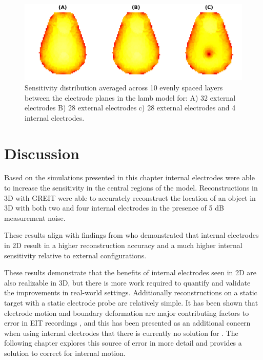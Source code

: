\begin{figure}[H]
\centering
\includegraphics[width=\columnwidth]{chapter6-internal_electrodes/imgs/lamb_sensitivity_profiles.pdf}
\caption[Sensitivity distribution in a lamb model]{\label{fig:sens_example}%
Sensitivity distribution averaged across 10 evenly spaced layers
between the electrode planes in the lamb model for: 
A) 32 external electrodes 
B) 28 external electrodes 
c) 28 external electrodes and 4 internal electrodes.
}
\end{figure}

\section{Discussion}

Based on the simulations presented in this chapter 
internal electrodes were able to increase the sensitivity in 
the central regions of the model. 
Reconstructions in 3D with GREIT were able to accurately 
reconstruct the location of an object in 3D with both 
two and four internal electrodes in the presence of 5 dB 
measurement noise. 

These results align with findings 
from 
who demonstrated that internal electrodes in 2D 
result in a higher reconstruction accuracy and 
a much higher internal sensitivity relative to external configurations.

These results demonstrate that the benefits of internal electrodes seen in 2D
are also realizable in 3D, but there is more 
work required to quantify and validate the improvements in real-world settings. 
Additionally reconstructions on a static target with a static electrode probe
are relatively simple. It has been shown that electrode motion and boundary
deformation are major contributing factors to error in EIT 
recordings \parencite{boyle_impact_2011,grychtol_impact_2012}, and this 
has been presented as an additional concern when using internal electrodes
that there is currently no solution for \parencite{nguyen_electrical_2020}.
The following chapter explores this source of error in more detail and 
provides a solution to correct for internal motion.

